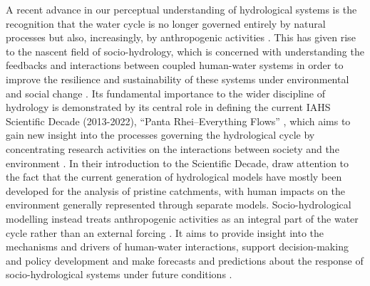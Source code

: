 \documentclass{icldt}\usepackage[]{graphicx}\usepackage[]{color}
\begin{document}
A recent advance in our perceptual understanding of hydrological systems is the recognition that the water cycle is no longer governed entirely by natural processes but also, increasingly, by anthropogenic activities \citep{montanari2013,savenije2014,sivapalan2015}. This has given rise to the nascent field of socio-hydrology, which is concerned with understanding the feedbacks and interactions between coupled human-water systems in order to improve the resilience and sustainability of these systems under environmental and social change \citep{sivapalan2012}. Its fundamental importance to the wider discipline of hydrology is demonstrated by its central role in defining the current IAHS Scientific Decade (2013-2022), ``Panta Rhei--Everything Flows'' \citep{montanari2013}, which aims to gain new insight into the processes governing the hydrological cycle by concentrating research activities on the interactions between society and the environment \citep{montanari2013,mcmillan2016}. In their introduction to the Scientific Decade, \citet{montanari2013} draw attention to the fact that the current generation of hydrological models have mostly been developed for the analysis of pristine catchments, with human impacts on the environment generally represented through separate models. Socio-hydrological modelling instead treats anthropogenic activities as an integral part of the water cycle rather than an external forcing \citep{troy2015}. It aims to provide insight into the mechanisms and drivers of human-water interactions, support decision-making and policy development and make forecasts and predictions about the response of socio-hydrological systems under future conditions \citep{kelly2013,blair2016}. \\

\end{document}
